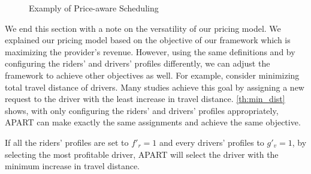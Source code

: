 \begin{figure}[!ht]
	\centering
	\vspace{-2mm}\caption{Examply of Price-aware Scheduling} \vspace{-2mm} \label{fig:quality_eg}
\end{figure}\vspace{-0mm}

We end this section with a note on the versatility of our pricing model. We explained our pricing model based on the objective of our framework which is maximizing the provider's revenue. However, using the same definitions and by configuring the riders' and drivers' profiles differently, we can adjust the framework to achieve other objectives as well. For example, consider minimizing total travel distance of drivers. Many studies \cite{Ma13,Huang14,Ma15} achieve this goal by assigning a new request to the driver with the least increase in travel distance. \cref{th:min_dist} shows, with only configuring the riders' and drivers' profiles appropriately, APART can make exactly the same assignments and achieve the same objective.

\vspace{-2mm}
\begin{theorem}
\label{th:min_dist}
If all the riders' profiles are set to $f'_r = 1$ and every drivers' profiles to $g'_v = 1$, by selecting the most profitable driver, APART will select the driver with the minimum increase in travel distance.
\end{theorem}

